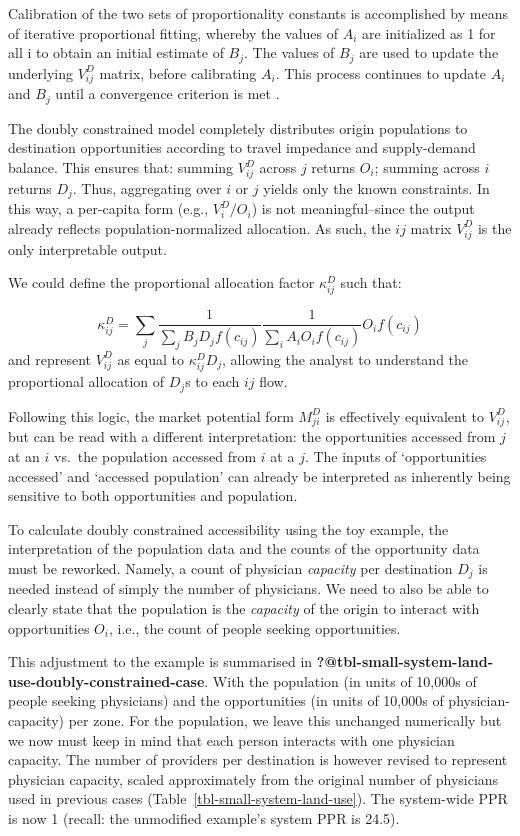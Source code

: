 \documentclass[
  10pt,
  letterpaper,
]{article}
\begin{document}
Calibration of the two sets of proportionality constants is accomplished
by means of iterative proportional fitting, whereby the values of
\(A_i\) are initialized as 1 for all i to obtain an initial estimate of
\(B_j\). The values of \(B_j\) are used to update the underlying
\(V_{ij}^D\) matrix, before calibrating \(A_i\). This process continues
to update \(A_i\) and \(B_j\) until a convergence criterion is met
\citep[see][p.~193-195]{ortuzar_2011_modelling}.

The doubly constrained model completely distributes origin populations
to destination opportunities according to travel impedance and
supply-demand balance. This ensures that: summing \(V^D_{ij}\) across
\(j\) returns \(O_i\); summing across \(i\) returns \(D_j\). Thus,
aggregating over \(i\) or \(j\) yields only the known constraints. In
this way, a per-capita form (e.g., \(V^D_i / O_i\)) is not
meaningful--since the output already reflects population-normalized
allocation. As such, the \(ij\) matrix \(V^D_{ij}\) is the only
interpretable output.

We could define the proportional allocation factor \(\kappa_{ij}^D\)
such that:

\[
\kappa_{ij}^D = \sum_j \frac{1}{\sum_j B_j D_j f(c_{ij})} \frac{1}{\sum_i A_i O_i f(c_{ij})} O_i f(c_{ij})
\] \noindent and represent \(V^D_{ij}\) as equal to
\(\kappa^D_{ij} D_j\), allowing the analyst to understand the
proportional allocation of \(D_j\)s to each \(ij\) flow.

Following this logic, the market potential form \(M^D_{ji}\) is
effectively equivalent to \(V_{ij}^D\), but can be read with a different
interpretation: the opportunities accessed from \(j\) at an \(i\)
vs.~the population accessed from \(i\) at a \(j\). The inputs of
`opportunities accessed' and `accessed population' can already be
interpreted as inherently being sensitive to both opportunities and
population.

To calculate doubly constrained accessibility using the toy example, the
interpretation of the population data and the counts of the opportunity
data must be reworked. Namely, a count of physician \emph{capacity} per
destination \(D_j\) is needed instead of simply the number of
physicians. We need to also be able to clearly state that the population
is the \emph{capacity} of the origin to interact with opportunities
\(O_i\), i.e., the count of people seeking opportunities.

This adjustment to the example is summarised in
\textbf{?@tbl-small-system-land-use-doubly-constrained-case}. With the
population (in units of 10,000s of people seeking physicians) and the
opportunities (in units of 10,000s of physician-capacity) per zone. For
the population, we leave this unchanged numerically but we now must keep
in mind that each person interacts with one physician capacity. The
number of providers per destination is however revised to represent
physician capacity, scaled approximately from the original number of
physicians used in previous cases
(Table~\ref{tbl-small-system-land-use}). The system-wide PPR is now 1
(recall: the unmodified example's system PPR is 24.5).
\end{document}
